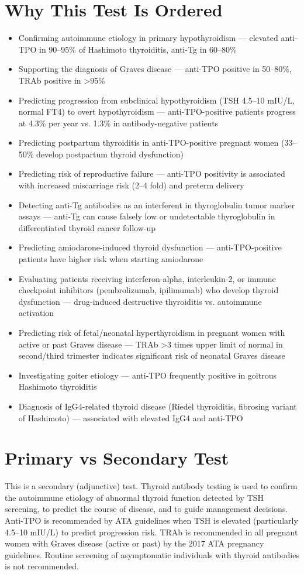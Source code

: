 \section*{Why This Test Is Ordered}
\begin{itemize}
  \item Confirming autoimmune etiology in primary hypothyroidism --- elevated anti-TPO in 90--95\% of Hashimoto thyroiditis, anti-Tg in 60--80\%
  \item Supporting the diagnosis of Graves disease --- anti-TPO positive in 50--80\%, TRAb positive in >95\%
  \item Predicting progression from subclinical hypothyroidism (TSH 4.5--10 mIU/L, normal FT4) to overt hypothyroidism --- anti-TPO-positive patients progress at 4.3\% per year vs. 1.3\% in antibody-negative patients
  \item Predicting postpartum thyroiditis in anti-TPO-positive pregnant women (33--50\% develop postpartum thyroid dysfunction)
  \item Predicting risk of reproductive failure --- anti-TPO positivity is associated with increased miscarriage risk (2--4 fold) and preterm delivery
  \item Detecting anti-Tg antibodies as an interferent in thyroglobulin tumor marker assays --- anti-Tg can cause falsely low or undetectable thyroglobulin in differentiated thyroid cancer follow-up
  \item Predicting amiodarone-induced thyroid dysfunction --- anti-TPO-positive patients have higher risk when starting amiodarone
  \item Evaluating patients receiving interferon-alpha, interleukin-2, or immune checkpoint inhibitors (pembrolizumab, ipilimumab) who develop thyroid dysfunction --- drug-induced destructive thyroiditis vs. autoimmune activation
  \item Predicting risk of fetal/neonatal hyperthyroidism in pregnant women with active or past Graves disease --- TRAb >3 times upper limit of normal in second/third trimester indicates significant risk of neonatal Graves disease
  \item Investigating goiter etiology --- anti-TPO frequently positive in goitrous Hashimoto thyroiditis
  \item Diagnosis of IgG4-related thyroid disease (Riedel thyroiditis, fibrosing variant of Hashimoto) --- associated with elevated IgG4 and anti-TPO
\end{itemize}

\section*{Primary vs Secondary Test}
This is a secondary (adjunctive) test. Thyroid antibody testing is used to confirm the autoimmune etiology of abnormal thyroid function detected by TSH screening, to predict the course of disease, and to guide management decisions. Anti-TPO is recommended by ATA guidelines when TSH is elevated (particularly 4.5--10 mIU/L) to predict progression risk. TRAb is recommended in all pregnant women with Graves disease (active or past) by the 2017 ATA pregnancy guidelines. Routine screening of asymptomatic individuals with thyroid antibodies is not recommended.

